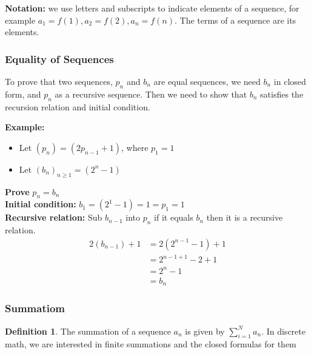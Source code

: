 \documentclass[12pt]{article}
\theoremstyle{definition}
\newtheorem{definition}{Definition}
\begin{document}
    \textbf{Notation:} we use letters and subscripts to indicate elements of a sequence,
    for example $a_1 = f(1), a_2 = f(2), a_n = f(n)$. The terms of a sequence are its elements.

    \subsubsection{Equality of Sequences}
    To prove that two sequences, $p_n$ and $b_n$ are equal sequences, we need
    $b_n$ in closed form, and $p_n$ as a recursive sequence. Then we need to show that
    $b_n$ satisfies the recursion relation and initial condition.

    \textbf{Example:}
    \begin{itemize}
        \item Let $(p_n)=(2p_{n-1}+1)$, where $p_1 = 1$
        \item Let $(b_n)_{n \ge 1}=(2^n-1)$
    \end{itemize}
  
    \textbf{Prove} $p_n = b_n$ \\
    \textbf{Initial condition:} $b_1=(2^1-1)=1=p_1=1$ \\
    \textbf{Recursive relation:} Sub $b_{n-1}$ into $p_n$ if it equals $b_n$
    then it is a recursive relation. 
    \begin{equation*}
        \begin{aligned}
            2(b_{n-1}) +1 &= 2(2^{n-1}-1)+1 \\
            &=2^{n-1+1}-2+1 \\
            &=2^n-1 \\
            &=b_n
        \end{aligned}
    \end{equation*}

    \subsubsection{Summatiom}
    \begin{definition}
        \label{def:summation}
        The summation of a sequence $a_n$ is given by $\sum^{N}_{i=1}a_n$. In discrete math, we are 
        interested in finite summations and the closed formulas for them
    \end{definition}
\end{document}
